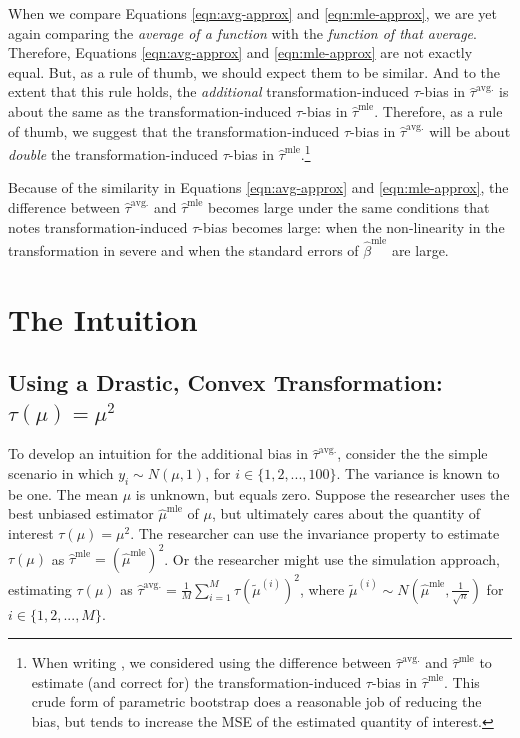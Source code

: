 \documentclass[10pt]{article}
\begin{document}
When we compare Equations \ref{eqn:avg-approx} and \ref{eqn:mle-approx}, we are yet again comparing the \textit{average of a function} with the \textit{function of that average}. 
Therefore, Equations \ref{eqn:avg-approx} and \ref{eqn:mle-approx} are not exactly equal. 
But, as a rule of thumb, we should expect them to be similar. And to the extent that this rule holds, the \emph{additional} transformation-induced $\tau$-bias in $\hat{\tau}^\text{avg.}$ is about the same as the transformation-induced $\tau$-bias in $\hat{\tau}^\text{mle}$. 
Therefore, as a rule of thumb, we suggest that the transformation-induced $\tau$-bias in $\hat{\tau}^\text{avg.}$ will be about \emph{double} the transformation-induced $\tau$-bias in $\hat{\tau}^\text{mle}$.\footnote{When writing \cite{Rainey2017}, we considered using the difference between $\hat{\tau}^\text{avg.}$ and $\hat{\tau}^\text{mle}$ to estimate (and correct for) the transformation-induced $\tau$-bias in $\hat{\tau}^\text{mle}$. This crude form of parametric bootstrap does a reasonable job of reducing the bias, but tends to increase the MSE of the estimated quantity of interest.}

Because of the similarity in Equations \ref{eqn:avg-approx} and \ref{eqn:mle-approx}, the difference between $\hat{\tau}^\text{avg.}$ and $\hat{\tau}^\text{mle}$ becomes large under the same conditions that \cite{Rainey2017} notes transformation-induced $\tau$-bias becomes large: when the non-linearity in the transformation in severe and when the standard errors of $\hat{\beta}^\text{mle}$ are large.

\section*{The Intuition}

\subsection*{Using a Drastic, Convex Transformation: $\tau(\mu) = \mu^2$}

To develop an intuition for the additional bias in $\hat{\tau}^\text{avg.}$, consider the the simple scenario in which $y_i \sim N(\mu, 1)$, for $i \in \{1, 2, ... , 100\}$. 
The variance is known to be one. 
The mean $\mu$ is unknown, but equals zero. 
Suppose the researcher uses the best unbiased estimator $\hat{\mu}^\text{mle}$ of $\mu$, but ultimately cares about the quantity of interest $\tau(\mu) = \mu^2$. 
The researcher can use the invariance property to estimate $\tau(\mu)$ as $\hat{\tau}^\text{mle} = \left( \hat{\mu}^\text{mle} \right) ^2$. 
Or the researcher might use the simulation approach, estimating $\tau(\mu)$ as $\hat{\tau}^\text{avg.} = \frac{1}{M} \sum_{i = 1}^M \tau \left( \tilde{\mu}^{(i)} \right)^2$, where $\tilde{\mu}^{(i)} \sim N \left( \hat{\mu}^\text{mle}, \frac{1}{\sqrt{n}} \right)$ for $i \in \{1, 2, ... , M\}$.
\end{document}
